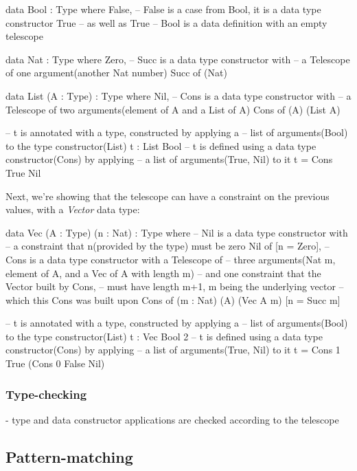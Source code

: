 \documentclass[
       embeddedlogo,
       english,
       lmodern,
       coorientadorbanca,
       noabntexcite
]{ufsc-thesis-rn46-2019}
\theoremstyle{definition}
\begin{document}
\begin{piforall}
data Bool : Type where {
       False,  -- False is a case from Bool, it is a data type constructor
       True    -- as well as True
} -- Bool is a data definition with an empty telescope

data Nat : Type where {
       Zero,
       -- Succ is a data type constructor with
       -- a Telescope of one argument(another Nat number)
       Succ of (Nat)
}

data List (A : Type) : Type where {
       Nil,
       -- Cons is a data type constructor with
       -- a Telescope of two arguments(element of A and a List of A)
       Cons of (A) (List A)
}

-- t is annotated with a type, constructed by applying a
-- list of arguments(Bool) to the type constructor(List)
t : List Bool
-- t is defined using a data type constructor(Cons) by applying
-- a list of arguments(True, Nil) to it
t = Cons True Nil
\end{piforall}

Next, we're showing that the telescope can have a constraint on the previous values, with a \emph{Vector} data type:

\begin{piforall}
data Vec (A : Type) (n : Nat) : Type where {
  -- Nil is a data type constructor with
  -- a constraint that n(provided by the type) must be zero
  Nil of [n = Zero],
  -- Cons is a data type constructor with a Telescope of 
  -- three arguments(Nat m, element of A, and a Vec of A with length m)
  -- and one constraint that the Vector built by Cons,
  -- must have length m+1, m being the underlying vector
  -- which this Cons was built upon
  Cons of (m : Nat) (A) (Vec A m) [n = Succ m]
}

-- t is annotated with a type, constructed by applying a
-- list of arguments(Bool) to the type constructor(List)
t : Vec Bool 2
-- t is defined using a data type constructor(Cons) by applying
-- a list of arguments(True, Nil) to it
t = Cons 1 True (Cons 0 False Nil)
\end{piforall}

\subsubsection{Type-checking}

- type and data constructor applications are checked according to the telescope

\subsection{Pattern-matching}
\end{document}
